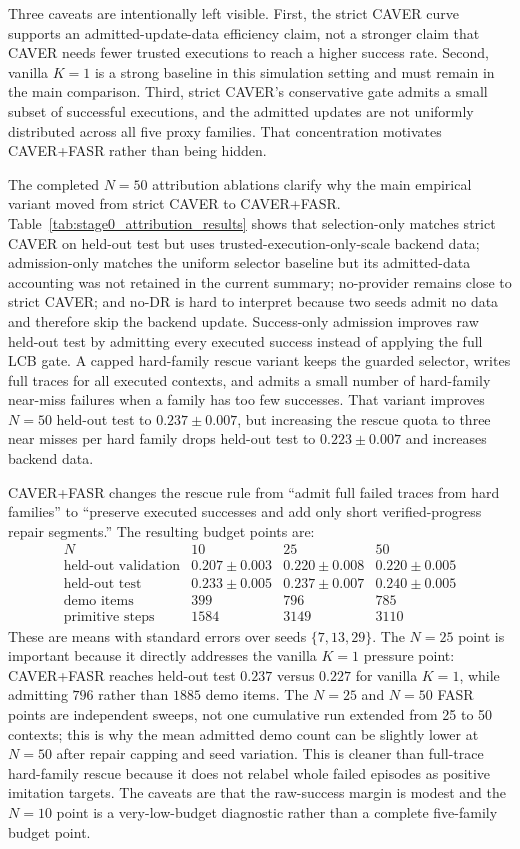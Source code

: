 \documentclass[10pt]{article}
\theoremstyle{plain}
\theoremstyle{definition}
\theoremstyle{remark}
\begin{document}
Three caveats are intentionally left visible. First, the strict CAVER curve supports an admitted-update-data efficiency claim, not a stronger claim that CAVER needs fewer trusted executions to reach a higher success rate. Second, vanilla $K=1$ is a strong baseline in this simulation setting and must remain in the main comparison. Third, strict CAVER's conservative gate admits a small subset of successful executions, and the admitted updates are not uniformly distributed across all five proxy families. That concentration motivates CAVER+FASR rather than being hidden.

The completed $N=50$ attribution ablations clarify why the main empirical variant moved from strict CAVER to CAVER+FASR. Table~\ref{tab:stage0_attribution_results} shows that selection-only matches strict CAVER on held-out test but uses trusted-execution-only-scale backend data; admission-only matches the uniform selector baseline but its admitted-data accounting was not retained in the current summary; no-provider remains close to strict CAVER; and no-DR is hard to interpret because two seeds admit no data and therefore skip the backend update. Success-only admission improves raw held-out test by admitting every executed success instead of applying the full LCB gate. A capped hard-family rescue variant keeps the guarded selector, writes full traces for all executed contexts, and admits a small number of hard-family near-miss failures when a family has too few successes. That variant improves $N=50$ held-out test to $0.237\pm0.007$, but increasing the rescue quota to three near misses per hard family drops held-out test to $0.223\pm0.007$ and increases backend data.

CAVER+FASR changes the rescue rule from ``admit full failed traces from hard families'' to ``preserve executed successes and add only short verified-progress repair segments.'' The resulting budget points are:
\[
\begin{array}{c|ccc}
N & 10 & 25 & 50\\
\hline
\text{held-out validation} & 0.207\pm0.003 & 0.220\pm0.008 & 0.220\pm0.005\\
\text{held-out test} & 0.233\pm0.005 & 0.237\pm0.007 & 0.240\pm0.005\\
\text{demo items} & 399 & 796 & 785\\
\text{primitive steps} & 1584 & 3149 & 3110
\end{array}
\]
These are means with standard errors over seeds $\{7,13,29\}$. The $N=25$ point is important because it directly addresses the vanilla $K=1$ pressure point: CAVER+FASR reaches held-out test $0.237$ versus $0.227$ for vanilla $K=1$, while admitting $796$ rather than $1885$ demo items. The $N=25$ and $N=50$ FASR points are independent sweeps, not one cumulative run extended from 25 to 50 contexts; this is why the mean admitted demo count can be slightly lower at $N=50$ after repair capping and seed variation. This is cleaner than full-trace hard-family rescue because it does not relabel whole failed episodes as positive imitation targets. The caveats are that the raw-success margin is modest and the $N=10$ point is a very-low-budget diagnostic rather than a complete five-family budget point.
\end{document}
